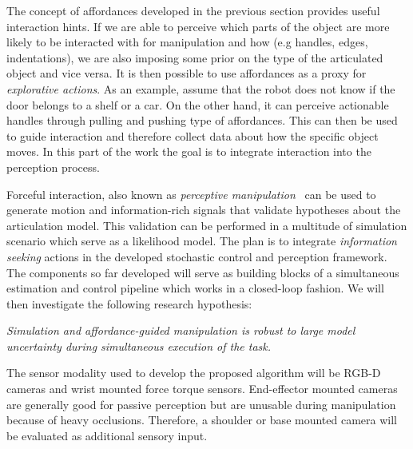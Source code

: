 The concept of affordances developed in the previous section provides useful interaction hints. If we are able to perceive which parts of the object are more likely to be interacted with for manipulation and how (e.g handles, edges, indentations), we are also imposing some prior on the type of the articulated object and vice versa. It is then possible to use affordances as a proxy for \emph{explorative actions}. As an example, assume that the robot does not know if the door belongs to a shelf or a car. On the other hand, it can perceive actionable handles through pulling and pushing type of affordances. This can then be used to guide interaction and therefore collect data about how the specific object moves. In this part of the work the goal is to integrate interaction into the perception process.

Forceful interaction, also known as \emph{perceptive manipulation}~\cite{bohg2017interactive} can be used to generate motion and information-rich signals that validate hypotheses about the articulation model. This validation can be performed in a multitude of simulation scenario which serve as a likelihood model. The plan is to integrate \emph{information seeking} actions in the developed stochastic control and perception framework. The components so far developed will serve as building blocks of a simultaneous estimation and control pipeline which works in a closed-loop fashion. We will then investigate the following research hypothesis:
\begin{displayquote}
\textit{Simulation and affordance-guided manipulation is robust to large model uncertainty during simultaneous execution of the task.} 
\end{displayquote}
The sensor modality used to develop the proposed algorithm will be RGB-D cameras and wrist mounted force torque sensors. End-effector mounted cameras are generally good for passive perception but are unusable during manipulation because of heavy occlusions. Therefore, a shoulder or base mounted camera will be evaluated as additional sensory input.  
 
